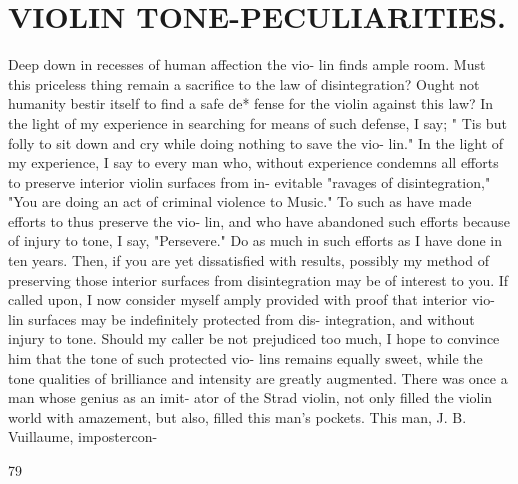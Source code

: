 \documentclass{article}
\begin{document}
\section*{VIOLIN TONE-PECULIARITIES.}
Deep down in recesses of human affection the vio- lin finds ample room. Must this priceless thing remain a sacrifice to the law of disintegration? Ought not humanity bestir itself to find a safe de* fense for the violin against this law? In the light of my experience in searching for means of such defense, I say; " Tis but folly to sit down and cry while doing nothing to save the vio- lin." In the light of my experience, I say to every man who, without experience condemns all efforts to preserve interior violin surfaces from in- evitable "ravages of disintegration," "You are doing an act of criminal violence to Music." To such as have made efforts to thus preserve the vio- lin, and who have abandoned such efforts because of injury to tone, I say, "Persevere." Do as much in such efforts as I have done in ten years. Then, if you are yet dissatisfied with results, possibly my method of preserving those interior surfaces from disintegration may be of interest to you. If called upon, I now consider myself amply provided with proof that interior vio- lin surfaces may be indefinitely protected from dis- integration, and without injury to tone. Should my caller be not prejudiced too much, I hope to convince him that the tone of such protected vio- lins remains equally sweet, while the tone qualities of brilliance and intensity are greatly augmented. There was once a man whose genius as an imit- ator of the Strad violin, not only filled the violin world with amazement, but also, filled this man's pockets. This man, J. B. Vuillaume, impostercon-

79
\end{document}
